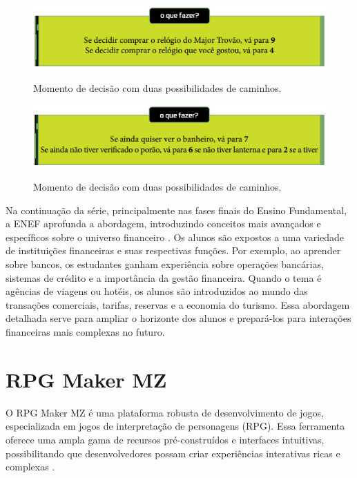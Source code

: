 \begin{figure}[ht]
	\centering
	\caption{Momento de decisão com duas possibilidades de caminhos.}
	\includegraphics[scale=.85]{Textuais/Pictures/Picture2.png}
	\label{fig:figure-2}
\end{figure}

\begin{figure}[ht]
	\centering
	\caption{Momento de decisão com duas possibilidades de caminhos.}
	\includegraphics[scale=.85]{Textuais/Pictures/Picture3.png}
	\label{fig:figure-3}
\end{figure}

\newpage

Na continuação da série, principalmente nas fases finais do Ensino Fundamental, a ENEF aprofunda a abordagem, introduzindo conceitos mais avançados e específicos sobre o universo financeiro \cite{ENEF_EM}. Os alunos são expostos a uma variedade de instituições financeiras e suas respectivas funções. Por exemplo, ao aprender sobre bancos, os estudantes ganham experiência sobre operações bancárias, sistemas de crédito e a importância da gestão financeira. Quando o tema é agências de viagens ou hotéis, os alunos são introduzidos ao mundo das transações comerciais, tarifas, reservas e a economia do turismo. Essa abordagem detalhada serve para ampliar o horizonte dos alunos e prepará-los para interações financeiras mais complexas no futuro.

\section{RPG Maker MZ}

O RPG Maker MZ é uma plataforma robusta de desenvolvimento de jogos, especializada em jogos de interpretação de personagens (RPG). Essa ferramenta oferece uma ampla gama de recursos pré-construídos e interfaces intuitivas, possibilitando que desenvolvedores possam criar experiências interativas ricas e complexas \cite{RPGMakerMZ}.

